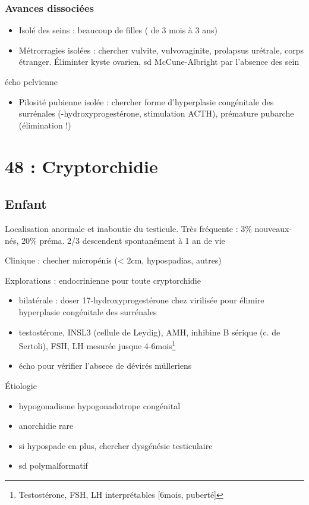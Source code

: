\documentclass[11pt]{article}
\begin{document}
\subsubsection{Avances dissociées}
\label{sec:org9ec5a76}
\begin{itemize}
\item Isolé des seins : beaucoup de filles ( de 3 mois à 3 ans)
\item Métrorragies isolées : chercher vulvite, vulvovaginite, prolapsus urétrale,
corps étranger. Éliminter kyste ovarien, sd McCune-Albright par l'absence des
sein
\end{itemize}
\thus écho pelvienne
\begin{itemize}
\item Pilosité pubienne isolée : chercher forme d'hyperplasie congénitale des
surrénales (-hydroxyprogestérone, stimulation ACTH), prémature pubarche
(élimination !)
\end{itemize}

\section{48 : Cryptorchidie}
\label{sec:orgcc47b70}
\subsection{Enfant}
\label{sec:orgdec4ae8}
Localisation anormale et inaboutie du testicule. Très fréquente : 3\%
nouveaux-nés, 20\% préma. 2/3 descendent spontanément à 1 an de vie

Clinique : checher micropénis (< 2cm, hypospadias, autres)

Explorations : endocrinienne pour toute cryptorchidie \danger
\begin{itemize}
\item bilatérale : doser 17-hydroxyprogestérone chez \female virilisée pour élimire hyperplasie
congénitale des surrénales
\item testostérone, INSL3 (cellule de Leydig), AMH, inhibine B sérique (c. de
Sertoli), FSH, LH mesurée jusque 4-6mois\footnote{\danger Testostérone, FSH, LH interprétables [6mois, puberté]}
\item écho pour vérifier l'absece de dévirés mülleriens
\end{itemize}

Étiologie
\begin{itemize}
\item hypogonadisme hypogonadotrope congénital
\item anorchidie rare
\item si hypospade en plus, chercher dysgénésie testiculaire
\item sd polymalformatif
\end{itemize}
\end{document}
